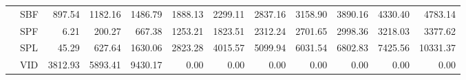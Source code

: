 \documentclass[11pt]{article}
\begin{document}
\begin{table}[htb]
\begin{center}
\begin{tabular}{llrrrrrrrrrr}
                             &  SBF  &             897.54  &       1182.16  &       1486.79  &       1888.13  &       2299.11  &       2837.16  &       3158.90  &       3890.16  &       4330.40  &       4783.14  \\
                             &  SPF  &               6.21  &        200.27  &        667.38  &       1253.21  &       1823.51  &       2312.24  &       2701.65  &       2998.36  &       3218.03  &       3377.62  \\
                             &  SPL  &              45.29  &        627.64  &       1630.06  &       2823.28  &       4015.57  &       5099.94  &       6031.54  &       6802.83  &       7425.56  &      10331.37  \\
                             &  VID  &            3812.93  &       5893.41  &       9430.17  &          0.00  &          0.00  &          0.00  &          0.00  &          0.00  &          0.00  &          0.00  \\
\end{tabular}
\end{center}
\end{table}
\end{document}
